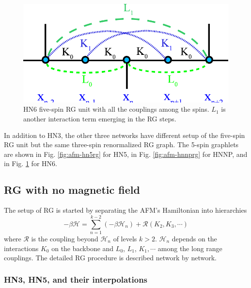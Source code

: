 \begin{figure}
\centering \includegraphics[scale=0.68]{Chapter-3/IsingRG_HN6_before}
\protect\caption{HN6 five-spin RG unit with all the couplings among the spins. $L_1$ is another interaction term emerging in the RG steps.}
\label{fig:afm-hn6rg}
\end{figure}

In addition to HN3, the other three networks have different setup of the five-spin RG unit but the same three-spin renormalized RG graph. The 5-spin graphlets are shown in Fig. \ref{fig:afm-hn5rg} \cite{Boettcher2011HNNP} for HN5, in Fig. \ref{fig:afm-hnnprg}  \cite{Boettcher2011HNNP} for HNNP, and in Fig. \ref{fig:afm-hn6rg} \cite{Boettcher2011HNNP} for HN6. 



\subsection{RG with no magnetic field}
The setup of RG is started by separating the AFM's Hamiltonian into hierarchies
\begin{equation}
-\beta\mathcal{H} = \sum_{n=1}^{k-2} (-\beta \mathcal{H}_n)+ \mathcal{R}(K_2, K_3, \cdots)
\end{equation}
where $\mathcal{R}$ is the coupling beyond $\mathcal{H}_n$ of levels $k>2$. $\mathcal{H}_n$ depends on the interactions $K_0$ on the backbone and $L_0$, $L_1$, $K_1, \cdots$ among the long range couplings. The detailed RG procedure is described network by network. 

\subsubsection{HN3, HN5, and their interpolations }
\label{sec:afm-HN35RG}

